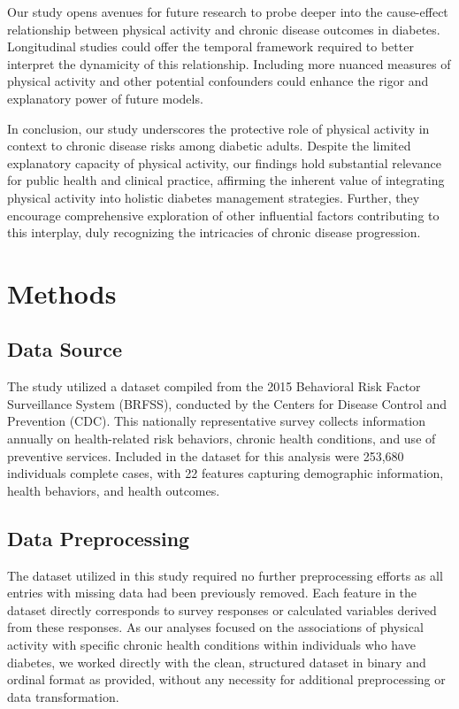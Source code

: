 \documentclass[11pt]{article}
\begin{document}
Our study opens avenues for future research to probe deeper into the cause-effect relationship between physical activity and chronic disease outcomes in diabetes. Longitudinal studies could offer the temporal framework required to better interpret the dynamicity of this relationship. Including more nuanced measures of physical activity and other potential confounders could enhance the rigor and explanatory power of future models.

In conclusion, our study underscores the protective role of physical activity in context to chronic disease risks among diabetic adults. Despite the limited explanatory capacity of physical activity, our findings hold substantial relevance for public health and clinical practice, affirming the inherent value of integrating physical activity into holistic diabetes management strategies. Further, they encourage comprehensive exploration of other influential factors contributing to this interplay, duly recognizing the intricacies of chronic disease progression.

\section*{Methods}

\subsection*{Data Source}
The study utilized a dataset compiled from the 2015 Behavioral Risk Factor Surveillance System (BRFSS), conducted by the Centers for Disease Control and Prevention (CDC). This nationally representative survey collects information annually on health-related risk behaviors, chronic health conditions, and use of preventive services. Included in the dataset for this analysis were 253,680 individuals complete cases, with 22 features capturing demographic information, health behaviors, and health outcomes.

\subsection*{Data Preprocessing}
The dataset utilized in this study required no further preprocessing efforts as all entries with missing data had been previously removed. Each feature in the dataset directly corresponds to survey responses or calculated variables derived from these responses. As our analyses focused on the associations of physical activity with specific chronic health conditions within individuals who have diabetes, we worked directly with the clean, structured dataset in binary and ordinal format as provided, without any necessity for additional preprocessing or data transformation.
\end{document}
